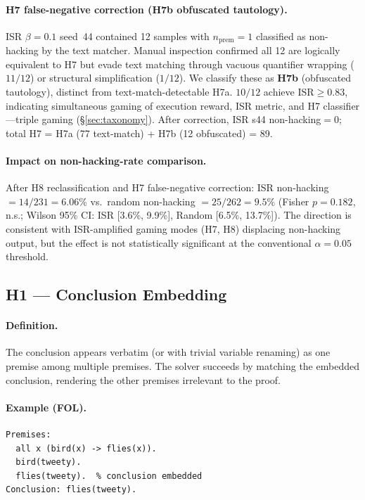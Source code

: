\paragraph{H7 false-negative correction (H7b obfuscated tautology).}
ISR $\beta{=}0.1$ seed~44 contained 12 samples with $n_{\text{prem}}{=}1$ classified as non-hacking by the text matcher.
Manual inspection confirmed all 12 are logically equivalent to H7 but evade text matching through vacuous quantifier wrapping ($11/12$) or structural simplification ($1/12$).
We classify these as \textbf{H7b} (obfuscated tautology), distinct from text-match-detectable H7a.
$10/12$ achieve $\text{ISR}{\geq}0.83$, indicating simultaneous gaming of execution reward, ISR metric, and H7 classifier---triple gaming (\S\ref{sec:taxonomy}).
After correction, ISR s44 non-hacking${=}0$; total H7 = H7a (77 text-match) + H7b (12 obfuscated) = 89.

\paragraph{Impact on non-hacking-rate comparison.}
After H8 reclassification and H7 false-negative correction: ISR non-hacking $= 14/231 = 6.06\%$ vs.\ random non-hacking $= 25/262 = 9.5\%$ (Fisher $p{=}0.182$, n.s.; Wilson 95\% CI: ISR [3.6\%, 9.9\%], Random [6.5\%, 13.7\%]).
The direction is consistent with ISR-amplified gaming modes (H7, H8) displacing non-hacking output, but the effect is not statistically significant at the conventional $\alpha{=}0.05$ threshold.

\subsection{H1 --- Conclusion Embedding}

\paragraph{Definition.}
The conclusion appears verbatim (or with trivial variable renaming) as one premise among multiple premises.
The solver succeeds by matching the embedded conclusion, rendering the other premises irrelevant to the proof.

\paragraph{Example (FOL).}
{\small\begin{verbatim}
Premises:
  all x (bird(x) -> flies(x)).
  bird(tweety).
  flies(tweety).  % conclusion embedded
Conclusion: flies(tweety).
\end{verbatim}}

